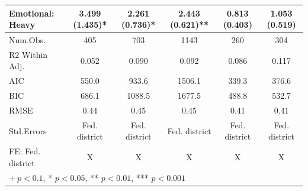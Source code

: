 \begin{tabular}{lccccc}
		Emotional: Heavy & \num{3.499} (\num{1.435})* & \num{2.261} (\num{0.736})* & \num{2.443} (\num{0.621})** & \num{0.813} (\num{0.403}) & \num{1.053} (\num{0.519})\\
		\midrule
		Num.Obs. & \num{405} & \num{703} & \num{1143} & \num{260} & \num{304}\\
		R2 Within Adj. & \num{0.052} & \num{0.090} & \num{0.092} & \num{0.086} & \num{0.117}\\
		AIC & \num{550.0} & \num{933.6} & \num{1506.1} & \num{339.3} & \num{376.6}\\
		BIC & \num{686.1} & \num{1088.5} & \num{1677.5} & \num{488.8} & \num{532.7}\\
		RMSE & \num{0.44} & \num{0.45} & \num{0.45} & \num{0.41} & \num{0.41}\\
		Std.Errors & Fed. district & Fed. district & Fed. district & Fed. district & Fed. district\\
		FE: Fed. district & X & X & X & X & X\\
		\bottomrule
		\multicolumn{6}{l}{$+\ p < 0.1$, * $p < 0.05$, ** $p < 0.01$, *** $p < 0.001$}
	\end{tabular}

